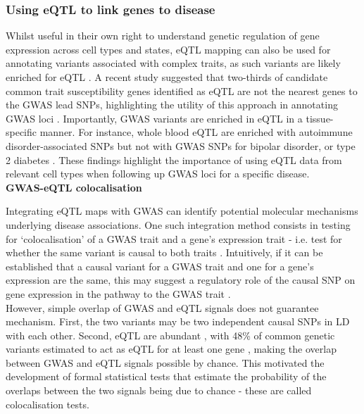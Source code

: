 \newpage

\subsubsection{Using eQTL to link genes to disease}

Whilst useful in their own right to understand genetic regulation of gene expression across cell types and states, eQTL mapping can also be used for annotating variants associated with complex traits, as such variants are likely enriched for eQTL \cite{nicolae2010trait}. 
A recent study suggested that two-thirds of candidate common trait susceptibility genes identified as eQTL are not the nearest genes to the GWAS lead SNPs, highlighting the utility of this approach in annotating GWAS loci \cite{zhu2016integration}. 
Importantly, GWAS variants are enriched in eQTL in a tissue-specific manner. 
For instance, whole blood eQTL are enriched with autoimmune disorder-associated SNPs but not with GWAS SNPs for bipolar disorder, or type 2 diabetes \cite{gtex2015genotype}. 
These findings highlight the importance of using eQTL data from relevant cell types when following up GWAS loci for a specific disease.\\

\textbf{GWAS-eQTL colocalisation}

Integrating eQTL maps with GWAS can identify potential molecular mechanisms underlying disease associations.
One such integration method consists in testing for `colocalisation' of a GWAS trait and a gene’s expression trait - i.e. test for whether the same variant is causal to both traits \cite{cannon2018deciphering}.
Intuitively, if it can be established that a causal variant for a GWAS trait and one for a gene’s expression are the same, this may suggest a regulatory role of the causal SNP on gene expression in the pathway to the GWAS trait \cite{he2013sherlock, ongen2017estimating}. \\

However, simple overlap of GWAS and eQTL signals does not guarantee mechanism. 
First, the two variants may be two independent causal SNPs in LD with each other.
Second, eQTL are abundant \cite{lappalainen2013transcriptome}, with 48\% of common genetic variants estimated to act as eQTL for at least one gene \cite{liu2019abundant}, making the overlap between GWAS and eQTL signals possible by chance.
This motivated the development of formal statistical tests that estimate the probability of the overlaps between the two signals being due to chance - these are called colocalisation tests. \\

